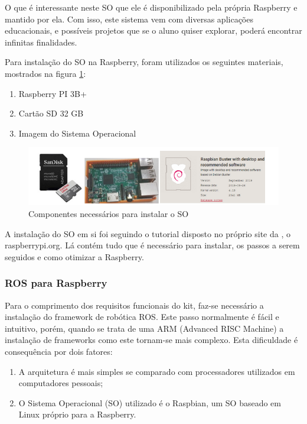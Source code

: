 O que é interessante neste SO que ele é disponibilizado pela própria Raspberry e mantido por ela. Com isso, este sistema vem com diversas aplicações educacionais, e possíveis projetos que se o aluno quiser explorar, poderá encontrar infinitas finalidades.

Para instalação do SO na Raspberry, foram utilizados os seguintes materiais, mostrados na figura \ref{fig:SO}:

\begin{enumerate}
	\item Raspberry PI 3B+
	\item Cartão SD 32 GB
	\item Imagem do Sistema Operacional
	
\end{enumerate}

\begin{figure}[H]
	\centering
	\includegraphics[scale=0.8, angle=0]{Figures/so.png}
	\caption{Componentes necessários para instalar o SO}
	\label{fig:SO}
\end{figure}

A instalação do SO em si foi seguindo o tutorial disposto no próprio site da \cite{RASPB}, o raspberrypi.org. Lá contém tudo que é necessário para instalar, os passos a serem seguidos e como otimizar a Raspberry.
\subsubsection{ROS para Raspberry}
Para o comprimento dos requisitos funcionais do kit, faz-se necessário a instalação do framework de robótica ROS. Este passo normalmente é fácil e intuitivo, porém, quando se trata de uma ARM (Advanced RISC Machine) a instalação de frameworks como este tornam-se mais complexo. Esta dificuldade é consequência por dois fatores:

\begin{enumerate}
	\item A arquitetura é mais simples se comparado com processadores utilizados em computadores pessoais;
	\item O Sistema Operacional (SO) utilizado é o Raspbian, um SO baseado em Linux próprio para a Raspberry.
\end{enumerate}

